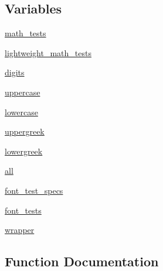 \subsection*{Variables}
\begin{DoxyCompactItemize}
\item 
\hyperlink{namespacematplotlib_1_1tests_1_1test__mathtext_a551117d47361ee3b9997c29b8dd0b0d1}{math\+\_\+tests}
\item 
\hyperlink{namespacematplotlib_1_1tests_1_1test__mathtext_ad0d428c4d5b47a361109870c86c073b8}{lightweight\+\_\+math\+\_\+tests}
\item 
\hyperlink{namespacematplotlib_1_1tests_1_1test__mathtext_aadc98acd5a469f3b9f6d6b3652b6b21b}{digits}
\item 
\hyperlink{namespacematplotlib_1_1tests_1_1test__mathtext_afd8de102ec36d497c440d3864f6ecc06}{uppercase}
\item 
\hyperlink{namespacematplotlib_1_1tests_1_1test__mathtext_a810bba0a2abe7bda78f823e0c3aa9644}{lowercase}
\item 
\hyperlink{namespacematplotlib_1_1tests_1_1test__mathtext_a9dc499d89b30143537bb2f051837434b}{uppergreek}
\item 
\hyperlink{namespacematplotlib_1_1tests_1_1test__mathtext_a9b92909982165873789ff8a404be0b82}{lowergreek}
\item 
\hyperlink{namespacematplotlib_1_1tests_1_1test__mathtext_a87d9ff964ffc1c79422e0be53020cc37}{all}
\item 
\hyperlink{namespacematplotlib_1_1tests_1_1test__mathtext_a1e7c1ac62d84ac70b87678b344f17801}{font\+\_\+test\+\_\+specs}
\item 
\hyperlink{namespacematplotlib_1_1tests_1_1test__mathtext_acf4bc91102b5d2b769861da5d0f94b63}{font\+\_\+tests}
\item 
\hyperlink{namespacematplotlib_1_1tests_1_1test__mathtext_aba0e215e043a6bce2c120170cad14751}{wrapper}
\end{DoxyCompactItemize}


\subsection{Function Documentation}
\mbox{\label{namespacematplotlib_1_1tests_1_1test__mathtext_aad4552044525169a91daf86d51ce1b15}} 
